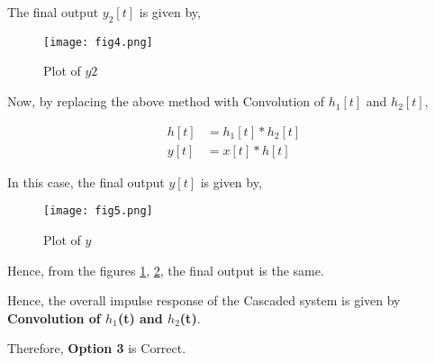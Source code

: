 \documentclass[journal,12pt,twocolumn]{IEEEtran}
\begin{document}
The final output $y_2[t]$ is given by,

\begin{figure}[H]
    \centering
    \texttt{[image: fig4.png]}
    \caption{Plot of $y2$}
    \label{y2}
\end{figure}

Now, by replacing the above method with Convolution of $h_1[t]$ and $h_2[t]$,

\begin{align}
    h[t] &= h_1[t] * h_2[t] \\
    y[t] &= x[t] * h[t]
\end{align}

In this case, the final output $y[t]$ is given by,

\begin{figure}[!h]
    \centering
    \texttt{[image: fig5.png]}
    \caption{Plot of $y$}
    \label{y}
\end{figure}

Hence, from the figures \ref{y2}, \ref{y}, the final output is the same.

Hence, the overall impulse response of the Cascaded system is given by \textbf{Convolution of $h_1$(t) and $h_2$(t)}.

Therefore, \textbf{Option 3} is Correct.
\end{document}

